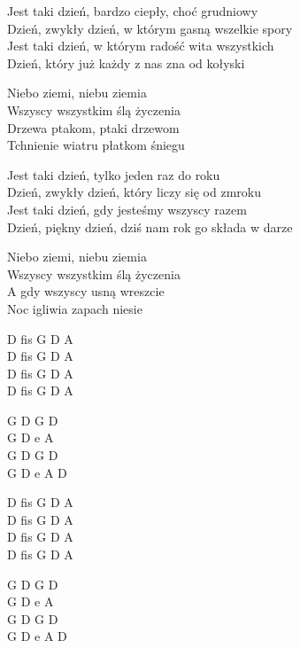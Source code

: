 \begin{text}
    Jest taki dzień, bardzo ciepły, choć grudniowy\\
    Dzień, zwykły dzień, w którym gasną wszelkie spory\\
    Jest taki dzień, w którym radość wita wszystkich\\
    Dzień, który już każdy z nas zna od kołyski

    \vin Niebo ziemi, niebu ziemia\\
    \vin Wszyscy wszystkim ślą życzenia\\
    \vin Drzewa ptakom, ptaki drzewom\\
    \vin Tchnienie wiatru płatkom śniegu

    Jest taki dzień, tylko jeden raz do roku\\
    Dzień, zwykły dzień, który liczy się od zmroku\\
    Jest taki dzień, gdy jesteśmy wszyscy razem\\
    Dzień, piękny dzień, dziś nam rok go składa w darze

    \vin Niebo ziemi, niebu ziemia\\
    \vin Wszyscy wszystkim ślą życzenia\\
    \vin A gdy wszyscy usną wreszcie\\
    \vin Noc igliwia zapach niesie 
\end{text}
\begin{chord}
    D fis G D A\\
    D fis G D A\\
    D fis G D A\\
    D fis G D A

    G D G D\\
    G D e A\\
    G D G D\\
    G D e A D

    D fis G D A\\
    D fis G D A\\
    D fis G D A\\
    D fis G D A

    G D G D\\
    G D e A\\
    G D G D\\
    G D e A D
\end{chord}